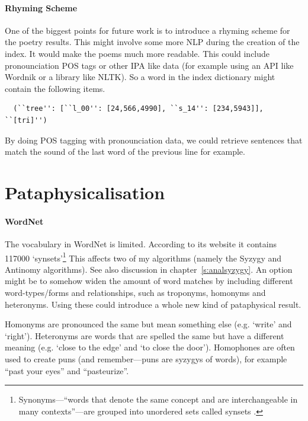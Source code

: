 \paragraph{Rhyming Scheme} 
One of the biggest points for future work is to introduce a rhyming scheme for the poetry results. This might involve some more \ac{NLP} during the creation of the index. It would make the poems much more readable. This could include pronounciation \ac{POS} tags or other \ac{IPA} like data (for example using an \ac{API} like Wordnik \autocite{Wordnik2016} or a library like \ac{NLTK}). So a word in the index dictionary might contain the following items.

\begin{verbatim}
  (``tree'': [``l_00'': [24,566,4990], ``s_14'': [234,5943]], ``[tri]'')
\end{verbatim}

By doing \ac{POS} tagging with pronounciation data, we could retrieve sentences that match the sound of the last word of the previous line for example.


\section{Pataphysicalisation}
\label{s:pataasp}

\paragraph{WordNet}
The vocabulary in WordNet is limited. According to its website \autocite{Princeton2010} it contains \num{117000} `synsets'\footnote{Synonyms---``words that denote the same concept and are interchangeable in many contexts''---are grouped into unordered sets called synsets \autocite{Princeton2010}.} This affects two of my algorithms (namely the Syzygy and Antinomy algorithms). See also discussion in chapter~\ref{s:analsyzygy}. An option might be to somehow widen the amount of word matches by including different word-types/forms and relationships, such as troponyms, homonyms and heteronyms. Using these could introduce a whole new kind of pataphysical result. 

Homonyms are pronounced the same but mean something else (e.g. `write' and `right'). Heteronyms are words that are spelled the same but have a different meaning (e.g. `close to the edge' and `to close the door'). Homophones are often used to create puns (and remember---puns are syzygys of words), for example ``past your eyes'' and ``pasteurize''. 

